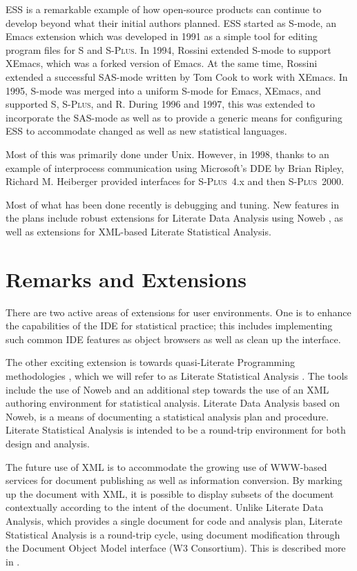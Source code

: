 \documentclass{article}
\newcommand*{\Splus}{\textsc{S-Plus}}
\begin{document}
ESS is a remarkable example of how open-source products can continue
to develop beyond what their initial authors planned.  ESS started as
S-mode, an Emacs extension which was developed in 1991 as a simple
tool for editing program files for S and \Splus.  In 1994, Rossini
extended S-mode to support XEmacs, which was a forked version of
Emacs.  At the same time, Rossini extended a successful SAS-mode
written by Tom Cook to work with XEmacs.  In 1995, S-mode was merged
into a uniform S-mode for Emacs, XEmacs, and supported S, \Splus, and
R. During 1996 and 1997, this was extended to incorporate the
SAS-mode as well as to provide a generic means for configuring ESS to
accommodate changed as well as new statistical languages.

Most of this was primarily done under Unix.  However, in 1998, thanks
to an example of interprocess communication using Microsoft's DDE by
Brian Ripley, Richard M. Heiberger provided interfaces for \Splus~4.x
and then \Splus~2000.

Most of what has been done recently is debugging and tuning.  New
features in the plans include robust extensions for Literate Data
Analysis using Noweb \citep{NRamsey:1994}, as well as extensions for
XML-based Literate Statistical Analysis.

\section{Remarks and Extensions}
\label{sec:remarks}

There are two active areas of extensions for user environments.  One
is to enhance the capabilities of the IDE for statistical practice;
this includes implementing such common IDE features as object browsers
as well as clean up the interface.

The other exciting extension is towards quasi-Literate Programming
methodologies \citep{Knuth:1992,NRamsey:1994}, which we will refer to as
Literate Statistical Analysis \citep{ross:lunt:2001}. The tools include
the use of Noweb \citep{NRamsey:1994} and an additional step towards the
use of an XML authoring environment for statistical analysis.
Literate Data Analysis based on Noweb, is a means of documenting a
statistical analysis plan and procedure.  Literate Statistical
Analysis is intended to be a round-trip environment for both design
and analysis.

The future use of XML is to accommodate the growing use of WWW-based
services for document publishing as well as information conversion.
By marking up the document with XML, it is possible to display subsets
of the document contextually according to the intent of the document.
Unlike Literate Data Analysis, which provides a single document for
code and analysis plan, Literate Statistical Analysis is a round-trip
cycle, using document modification through the Document Object Model
interface (W3 Consortium).  This is described more in
\citep{ross:lunt:2001}. 



\end{document}
